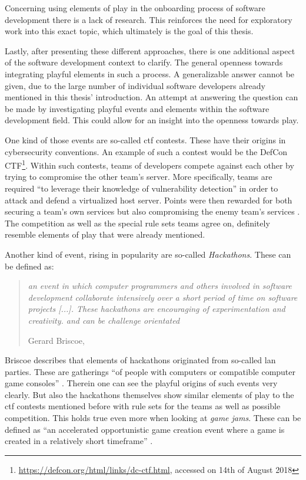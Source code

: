 Concerning using elements of play in the onboarding process of software development there is a lack of research. This reinforces the need for exploratory work into this exact topic, which ultimately is the goal of this thesis.

Lastly, after presenting these different approaches, there is one additional aspect of the software development context to clarify. The general openness towards integrating playful elements in such a process. A generalizable answer cannot be given, due to the large number of individual software developers already mentioned in this thesis' introduction. An attempt at answering the question can be made by investigating playful events and elements within the software development field. This could allow for an insight into the openness towards play.

One kind of those events are so-called \gls{ctf} contests. These have their origins in cybersecurity conventions. An example of such a contest would be the DefCon CTF\footnote{\url{https://defcon.org/html/links/dc-ctf.html}, accessed on 14th of August 2018}. Within such contests, teams of developers compete against each other by trying to compromise the other team's server. More specifically, teams are required \enquote{to leverage their knowledge of vulnerability detection} \cite[p. 134]{childers2010organizing} in order to attack and defend a virtualized host server. Points were then rewarded for both securing a team's own services but also compromising the enemy team's services \cite[p. 132-135]{childers2010organizing}. The competition as well as the special rule sets teams agree on, definitely resemble elements of play that were already mentioned.

Another kind of event, rising in popularity are so-called \textit{Hackathons}. These can be defined as:

\begin{quote}
  \textit{an event in which computer programmers and others involved in software development collaborate intensively over a short period of time on software projects [...]. These hackathons are encouraging of experimentation and creativity. and can be challenge orientated}

  \footnotesize{Gerard Briscoe, \cite[p. 1]{briscoe2014digital}}
\end{quote}

Briscoe describes that elements of hackathons originated from so-called \gls{lan} parties. These are gatherings \enquote{of people with computers or compatible computer game consoles} \cite[p. 3]{briscoe2014digital}. Therein one can see the playful origins of such events very clearly. But also the hackathons themselves show similar elements of play to the \gls{ctf} contests mentioned before with rule sets for the teams as well as possible competition. This holds true even more when looking at \textit{game jams}. These can be defined as \enquote{an accelerated opportunistic game creation event where a game is created in a relatively short timeframe} \cite{kultima2015defining}.

